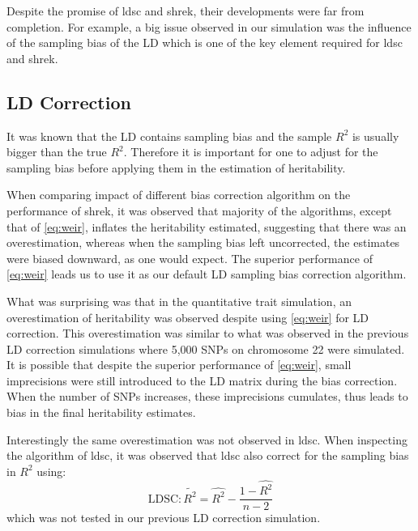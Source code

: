 	Despite the promise of \gls{ldsc} and \gls{shrek}, their developments were far from completion.
	For example, a big issue observed in our simulation was the influence of the sampling bias of the \gls{LD} which is one of the key element required for \gls{ldsc} and \gls{shrek}.
	
	\subsection{LD Correction}
	It was known that the \gls{LD} contains sampling bias and the sample $R^2$ is usually bigger than the true $R^2$.
	Therefore it is important for one to adjust for the sampling bias before applying them in the estimation of heritability.
	
	When comparing impact of different bias correction algorithm on the performance of \gls{shrek}, it was observed that majority of the algorithms, except that of \cref{eq:weir}, inflates the heritability estimated, suggesting that there was an overestimation, whereas when the sampling bias left uncorrected, the estimates were biased downward, as one would expect.
	The superior performance of \cref{eq:weir} leads us to use it as our default \gls{LD} sampling bias correction algorithm.
	
	What was surprising was that in the quantitative trait simulation, an overestimation of heritability was observed despite using \cref{eq:weir} for \gls{LD} correction.
	This overestimation was similar to what was observed in the previous \gls{LD} correction simulations where 5,000 \glspl{SNP} on chromosome 22 were simulated.
	It is possible that despite the superior performance of \cref{eq:weir}, small imprecisions were still introduced to the \gls{LD} matrix during the bias correction.
	When the number of \glspl{SNP} increases, these imprecisions cumulates, thus leads to bias in the final heritability estimates.
	
	Interestingly the same overestimation was not observed in \gls{ldsc}.
	When inspecting the algorithm of \gls{ldsc}, it was observed that \gls{ldsc} also correct for the sampling bias in $R^2$ using:
	\begin{equation}
	\text{LDSC}: \tilde{R^2}= \hat{R^2}-\frac{1-\hat{R^2}}{n-2}\label{eq:ldscR2} 
	\end{equation}
	which was not tested in our previous \gls{LD} correction simulation.
	
